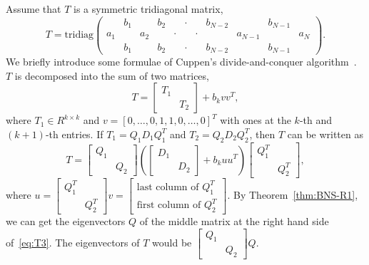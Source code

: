 \documentclass[times]{nlaauth}
\newcounter{algorithm}
\begin{document}
Assume that $T$ is a symmetric tridiagonal matrix,
\begin{equation}
\label{eq:T}
T=\text{tridiag}\left( \begin{array}{ccccccccccc}
& b_1 & & b_2 & & \cdotp & & b_{N-2} & & b_{N-1} & \\
a_1 & & a_2 & & \cdotp & & \cdotp & &  a_{N-1} & & a_N \\
& b_1 & & b_2 & & \cdotp & & b_{N-2} & & b_{N-1} &
 \end{array} \right).
\end{equation}
We briefly introduce some formulae of Cuppen's divide-and-conquer
algorithm~\cite{Cuppen81,Rutter94}.
$T$ is decomposed into the sum of two matrices,
\begin{equation}
  \label{eq:T2}
  T=
  \begin{bmatrix}
    T_1 & \\ & T_2
  \end{bmatrix}+b_k vv^T,
\end{equation}
where $T_1\in R^{k\times k}$ and $v=[0,\ldots,0,1,1,0,\ldots,0]^T$ with
ones at the $k$-th and $(k+1)$-th entries.
If $T_1=Q_1 D_1Q_1^T$ and $T_2=Q_2 D_2 Q_2^T$, then $T$ can be written as
\begin{equation}
  \label{eq:T3}
  T=
  \begin{bmatrix}
    Q_1 & \\ & Q_2
  \end{bmatrix} \left(
  \begin{bmatrix}
    D_1 & \\ & D_2
  \end{bmatrix} + b_k uu^T \right)
\begin{bmatrix}
  Q_1^T & \\ & Q_2^T
\end{bmatrix},
\end{equation}
where $u=
\begin{bmatrix}
  Q_1^T & \\ & Q_2^T
\end{bmatrix} v =
\begin{bmatrix}
  \text{last column of } Q_1^T \\
  \text{first column of } Q_2^T
\end{bmatrix}.
$
By Theorem~\ref{thm:BNS-R1}, we can get the eigenvectors $Q$ of the middle
matrix at the right hand side of~\eqref{eq:T3}.
The eigenvectors of $T$ would be $\begin{bmatrix} Q_1 & \\ & Q_2\end{bmatrix}Q$.
\end{document}
